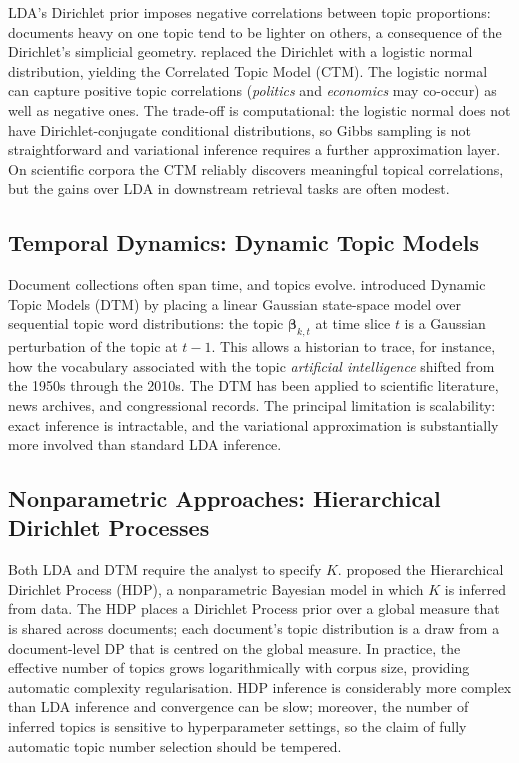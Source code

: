 \documentclass[11pt,a4paper]{article}
\newcommand{\vect}[1]{\boldsymbol{#1}}
\begin{document}
LDA's Dirichlet prior imposes negative correlations between topic
proportions: documents heavy on one topic tend to be lighter on
others, a consequence of the Dirichlet's simplicial geometry.
\textcite{blei2005correlated} replaced the Dirichlet with a logistic
normal distribution, yielding the Correlated Topic Model (CTM).
The logistic normal can capture positive topic correlations
(\emph{politics} and \emph{economics} may co-occur) as well as
negative ones.
The trade-off is computational: the logistic normal does not have
Dirichlet-conjugate conditional distributions, so Gibbs sampling is
not straightforward and variational inference requires a further
approximation layer.
On scientific corpora the CTM reliably discovers meaningful topical
correlations, but the gains over LDA in downstream retrieval tasks are
often modest.

\subsection{Temporal Dynamics: Dynamic Topic Models}
\label{sec:dtm}

Document collections often span time, and topics evolve.
\textcite{blei2006dynamic} introduced Dynamic Topic Models (DTM) by
placing a linear Gaussian state-space model over sequential topic
word distributions: the topic $\vect{\beta}_{k,t}$ at time slice $t$
is a Gaussian perturbation of the topic at $t-1$.
This allows a historian to trace, for instance, how the vocabulary
associated with the topic \emph{artificial intelligence} shifted from
the 1950s through the 2010s.
The DTM has been applied to scientific literature, news archives, and
congressional records.
The principal limitation is scalability: exact inference is intractable,
and the variational approximation is substantially more involved than
standard LDA inference.

\subsection{Nonparametric Approaches: Hierarchical Dirichlet Processes}
\label{sec:hdp}

Both LDA and DTM require the analyst to specify $K$.
\textcite{teh2006hierarchical} proposed the Hierarchical Dirichlet
Process (HDP), a nonparametric Bayesian model in which $K$ is inferred
from data.
The HDP places a Dirichlet Process prior over a global measure that
is shared across documents; each document's topic distribution is
a draw from a document-level DP that is centred on the global measure.
In practice, the effective number of topics grows logarithmically
with corpus size, providing automatic complexity regularisation.
HDP inference is considerably more complex than LDA inference and
convergence can be slow; moreover, the number of inferred topics is
sensitive to hyperparameter settings, so the claim of fully automatic
topic number selection should be tempered.
\end{document}
